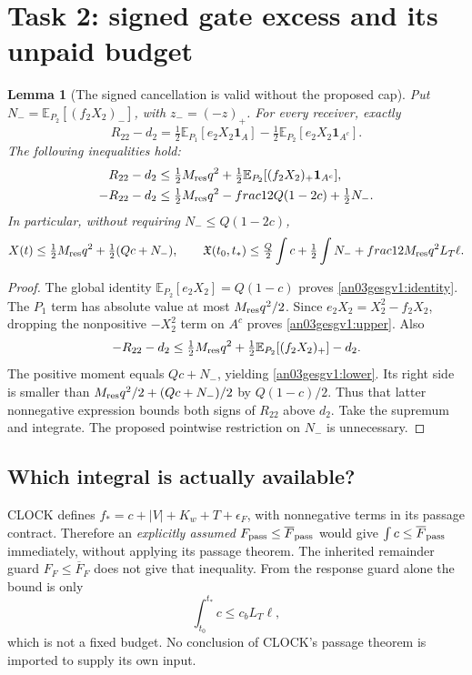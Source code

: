 \documentclass[11pt]{article}
\newtheorem{lemma}[proposition]{Lemma}
\theoremstyle{remark}\newtheorem{remark}[proposition]{Remark}
\newcommand{\E}{\mathbb E}
\newcommand{\one}{\mathbf1}
\begin{document}
\section{Task 2: signed gate excess and its unpaid budget}
\begin{lemma}[The signed cancellation is valid without the proposed cap]
\label{an03gesgv1:signed}
Put $N_-=\E_{P_2}[(f_2X_2)_-]$, with $z_-=(-z)_+$.
For every receiver, exactly
\begin{equation}
 R_{22}-d_2=\tfrac12\E_{P_1}[e_2X_2\one_A]
              -\tfrac12\E_{P_2}[e_2X_2\one_{A^c}].
 \label{an03gesgv1:identity}
\end{equation}
The following inequalities hold:
\begin{align}
 R_{22}-d_2
 &\le \tfrac12 M_{\rm res}q^2+
             \tfrac12\E_{P_2}[(f_2X_2)_+\one_{A^c}],
 \label{an03gesgv1:upper}\\
 -R_{22}-d_2
 &\le \tfrac12 M_{\rm res}q^2-	frac12Q(1-2c)+\tfrac12N_-.
 \label{an03gesgv1:lower}
\end{align}
In particular, without requiring $N_-\le Q(1-2c)$,
\begin{equation}
 X(t)\le\tfrac12M_{\rm res}q^2+\tfrac12(Qc+N_-),\qquad
 \mathfrak X(t_0,t_*)\le
 \tfrac Q2\int c+\tfrac12\int N_-+	frac12M_{\rm res}q^2L_T\ell.
 \label{an03gesgv1:Xbound}
\end{equation}
\end{lemma}
\begin{proof}
The global identity $\E_{P_2}[e_2X_2]=Q(1-c)$ proves
\eqref{an03gesgv1:identity}. The $P_1$ term has absolute
value at most $M_{\rm res}q^2/2$.
Since $e_2X_2=X_2^2-f_2X_2$, dropping the nonpositive
$-X_2^2$ term on $A^c$ proves \eqref{an03gesgv1:upper}.
Also
\[
 -R_{22}-d_2\le\tfrac12M_{\rm res}q^2
       +\tfrac12\E_{P_2}[(f_2X_2)_+]-d_2.
\]
The positive moment equals $Qc+N_-$, yielding
\eqref{an03gesgv1:lower}. Its right side is smaller than
$M_{\rm res}q^2/2+(Qc+N_-)/2$ by $Q(1-c)/2$.
Thus that latter nonnegative expression bounds both signs
of $R_{22}$ above $d_2$. Take the supremum and integrate.
The proposed pointwise restriction on $N_-$ is unnecessary.
\end{proof}

\subsection*{Which integral is actually available?}
\label{an03gesgv1:budgetsection}
CLOCK defines
$f_*=c+|V|+K_w+T+\epsilon_F$, with nonnegative terms in its
passage contract. Therefore an \emph{explicitly assumed}
$F_{\rm pass}\le\overline F_{\rm pass}$ would give
$\int c\le\overline F_{\rm pass}$ immediately, without
applying its passage theorem. The inherited remainder guard
$F_F\le\overline F_F$ does not give that inequality.
From the response guard alone the bound is only
\begin{equation}
 \int_{t_0}^{t_*}c\le c_bL_T\ell,
 \label{an03gesgv1:responseonly}
\end{equation}
which is not a fixed budget. No conclusion of CLOCK's
passage theorem is imported to supply its own input.
\end{document}
